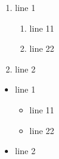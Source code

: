 \documentclass[11pt]{article}
\begin{document}
\begin{enumerate}
\item line 1
	\begin{enumerate}
	\item line 11
	\item line 22
	\end{enumerate}
\item line 2
\end{enumerate}

\begin{itemize}
\item line 1
	\begin{itemize}
	\item line 11
	\item line 22
	\end{itemize}
\item line 2
\end{itemize}
\end{document}
